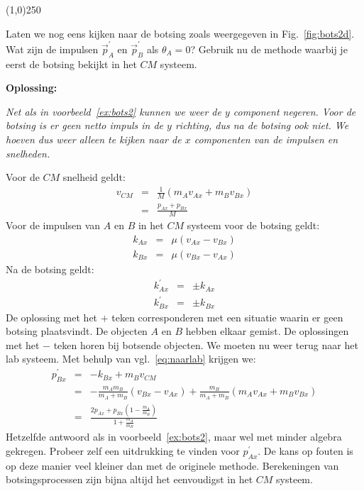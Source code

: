 \begin{center}
\line(1,0){250}
\end{center}
\begin{voorbeeld} \label{ex:bots3}
Laten we nog eens kijken naar de botsing zoals weergegeven in Fig.~\ref{fig:bots2d}. Wat zijn
de impulsen $\vec{p}_A^{\prime}$ en $\vec{p}_B^{\prime}$ als $\theta_A=0$? Gebruik nu
de methode waarbij je eerst de botsing bekijkt in het $CM$ systeem.

{\bf Oplossing: }{\it Net als in voorbeeld~\ref{ex:bots2} kunnen we weer de $y$ component negeren. Voor
de botsing is er geen netto impuls in de $y$ richting, dus na de botsing ook niet. We hoeven dus weer alleen
te kijken naar de $x$ componenten van de impulsen en snelheden.

Voor de $CM$ snelheid geldt:
\begin{eqnarray}
v_{CM} & = & \frac{1}{M}(m_A v_{Ax} + m_B v_{Bx}) \\
& = & \frac{p_{Ax} + p_{Bx}}{M}
\end{eqnarray}
Voor de impulsen van $A$ en $B$ in het $CM$ systeem voor de botsing geldt:
\begin{eqnarray}
k_{Ax} & = & \mu (v_{Ax} - v_{Bx}) \\
k_{Bx} & = & \mu (v_{Bx} - v_{Ax}) 
\end{eqnarray}
Na de botsing geldt:
\begin{eqnarray}
k_{Ax}^{\prime} & = & \pm k_{Ax} \\
k_{Bx}^{\prime} & = & \pm k_{Bx} 
\end{eqnarray}
De oplossing met het $+$ teken corresponderen met een situatie waarin er geen botsing plaatsvindt. De
objecten $A$ en $B$ hebben elkaar gemist. De oplossingen met het $-$ teken horen bij botsende objecten.
We moeten nu weer terug naar het lab systeem. Met behulp van vgl.~\ref{eq:naarlab} krijgen we:
\begin{eqnarray}
p_{Bx}^{\prime} & = & -k_{Bx} + m_B v_{CM} \\
                             & = & -\frac{m_A m_B}{m_A+m_B} (v_{Bx} - v_{Ax}) + \frac{m_B}{m_A+m_B}(m_A v_{Ax} + m_B v_{Bx}) \\
                             & = & \frac{2p_{Ax} + p_{Bx}(1-\frac{m_A}{m_B})}{1+\frac{m_A}{m_B}}
\end{eqnarray}
Hetzelfde antwoord als in voorbeeld~\ref{ex:bots2}, maar wel met minder algebra gekregen. Probeer zelf een uitdrukking
te vinden voor $p_{Ax}^{\prime}$. De kans op fouten is op deze manier veel kleiner dan met de originele methode. 
Berekeningen van botsingsprocessen zijn bijna altijd het eenvoudigst in het $CM$ systeem.
}
\end{voorbeeld}
